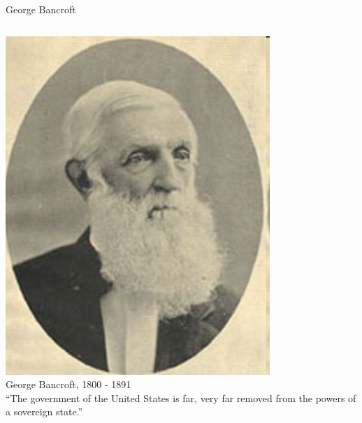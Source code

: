 \begin{frame}{George Bancroft}
    \begin{columns}[c]
            \centering
            \includegraphics[width=0.75\textwidth]{img/george-bancroft.png} \\
            George Bancroft, 1800 - 1891 \\
        \column{0.5\textheight}
            ``The government of the United States is far, very far removed from the powers of a sovereign state.''
    \end{columns}
\end{frame}


